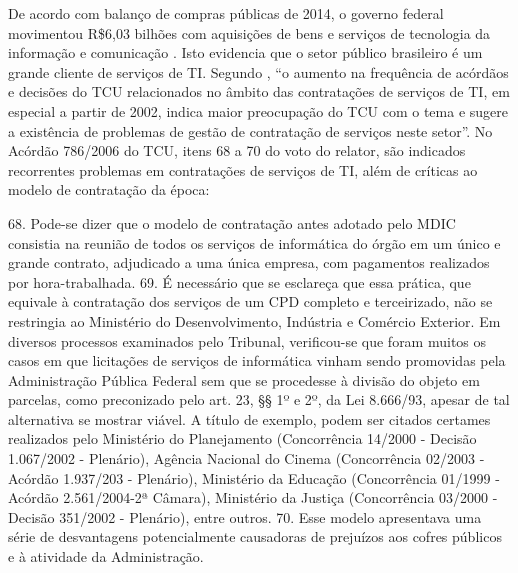 De acordo com balanço de compras públicas de 2014, o governo federal movimentou R\$6,03 bilhões com aquisições de bens e serviços de tecnologia da informação e comunicação \cite{balanco:14}. Isto evidencia que o setor público brasileiro é um grande cliente de serviços de TI. Segundo , ``o aumento na frequência de acórdãos e decisões do TCU relacionados no âmbito das contratações de serviços de TI, em especial a partir de 2002, indica maior preocupação do TCU com o tema e sugere a existência de problemas de gestão de contratação de serviços neste setor''. No Acórdão 786/2006 do TCU, itens 68 a 70 do voto do relator, são indicados recorrentes problemas em contratações de serviços de TI, além de críticas ao modelo de contratação da época:
\begin{citacao}
68.	Pode-se dizer que o modelo de contratação antes adotado pelo MDIC consistia na reunião de todos os serviços de informática do órgão em um único e grande contrato, adjudicado a uma única empresa, com pagamentos realizados por hora-trabalhada. 
69.	É necessário que se esclareça que essa prática, que equivale à contratação dos serviços de um CPD completo e terceirizado, não se restringia ao Ministério do Desenvolvimento, Indústria e Comércio Exterior. Em diversos processos examinados pelo Tribunal, verificou-se que foram muitos os casos em que licitações de serviços de informática vinham sendo promovidas pela Administração Pública Federal sem que se procedesse à divisão do objeto em parcelas, como preconizado pelo art. 23, §§ 1º e 2º, da Lei 8.666/93, apesar de tal alternativa se mostrar viável. A título de exemplo, podem ser citados certames realizados pelo Ministério do Planejamento (Concorrência 14/2000 - Decisão 1.067/2002 - Plenário), Agência Nacional do Cinema (Concorrência 02/2003 - Acórdão 1.937/203 - Plenário), Ministério da Educação (Concorrência 01/1999 - Acórdão 2.561/2004-2ª Câmara), Ministério da Justiça (Concorrência 03/2000 - Decisão 351/2002 - Plenário), entre outros.
70.	Esse modelo apresentava uma série de desvantagens potencialmente causadoras de prejuízos aos cofres públicos e à atividade da Administração. 
\end{citacao}

